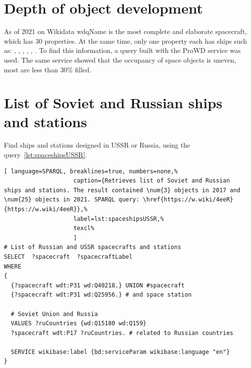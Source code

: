 \section{Depth of object development}

As of 2021 on Wikidata  {wdqName} is the most complete and elaborate spacecraft, which has 30 properties.\autocite{spacecraftProWD} At the same time, only one property each has ships such as: , , , 
, 
, 
.\autocite{spacecraftProWD} 
To find this information, a query built with the ProWD\autocite{spacecraftProWD} service was used. 
The same service showed that the occupancy of space objects is uneven, 
most are less than 30\% filled.\autocite{spacecraftProWD} 

\section{List of Soviet and Russian ships and stations}

Find ships and stations designed in USSR or Russia, using the query~\ref{lst:spaceshipsUSSR}.

\begin{lstlisting}[ language=SPARQL, breaklines=true, numbers=none,%
                    caption={Retrieves list of Soviet and Russian ships and stations. The result contained \num{3} objects in 2017 and \num{25} objects in 2021. SPARQL query: \href{https://w.wiki/4eeR}{https://w.wiki/4eeR}},%
                    label=lst:spaceshipsUSSR,%
                    texcl%
                    ]
# List of Russian and USSR spacecrafts and stations
SELECT  ?spacecraft  ?spacecraftLabel 
WHERE
{
  {?spacecraft wdt:P31 wd:Q40218.} UNION #spacecraft
  {?spacecraft wdt:P31 wd:Q25956.} # and space station
  
  # Soviet Union and Russia
  VALUES ?ruCountries {wd:Q15180 wd:Q159}
  ?spacecraft wdt:P17 ?ruCountries. # related to Russian countries
  
  SERVICE wikibase:label {bd:serviceParam wikibase:language "en"}
}
\end{lstlisting}%

